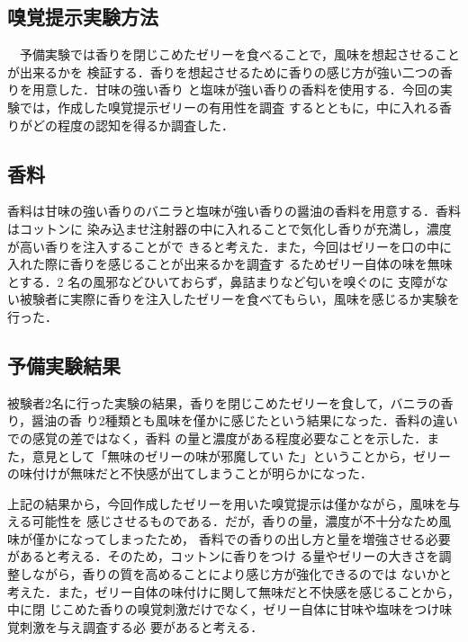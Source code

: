 \subsection{嗅覚提示実験方法}

　予備実験では香りを閉じこめたゼリーを食べることで，風味を想起させることが出来るかを
検証する．香りを想起させるために香りの感じ方が強い二つの香りを用意した．甘味の強い香り
と塩味が強い香りの香料を使用する．今回の実験では，作成した嗅覚提示ゼリーの有用性を調査
するとともに，中に入れる香りがどの程度の認知を得るか調査した．


\subsection{香料}

香料は甘味の強い香りのバニラと塩味が強い香りの醤油の香料を用意する．香料はコットンに
染み込ませ注射器の中に入れることで気化し香りが充満し，濃度が高い香りを注入することがで
きると考えた．また，今回はゼリーを口の中に入れた際に香りを感じることが出来るかを調査す
るためゼリー自体の味を無味とする．2 名の風邪などひいておらず，鼻詰まりなど匂いを嗅ぐのに
支障がない被験者に実際に香りを注入したゼリーを食べてもらい，風味を感じるか実験を行った．


\subsection{予備実験結果}

被験者2名に行った実験の結果，香りを閉じこめたゼリーを食して，バニラの香り，醤油の香
り2種類とも風味を僅かに感じたという結果になった．香料の違いでの感覚の差ではなく，香料
の量と濃度がある程度必要なことを示した．また，意見として「無味のゼリーの味が邪魔してい
た」ということから，ゼリーの味付けが無味だと不快感が出てしまうことが明らかになった．


上記の結果から，今回作成したゼリーを用いた嗅覚提示は僅かながら，風味を与える可能性を
感じさせるものである．だが，香りの量，濃度が不十分なため風味が僅かになってしまったため，
香料での香りの出し方と量を増強させる必要があると考える．そのため，コットンに香りをつけ
る量やゼリーの大きさを調整しながら，香りの質を高めることにより感じ方が強化できるのでは
ないかと考えた．また，ゼリー自体の味付けに関して無味だと不快感を感じることから，中に閉
じこめた香りの嗅覚刺激だけでなく，ゼリー自体に甘味や塩味をつけ味覚刺激を与え調査する必
要があると考える．
